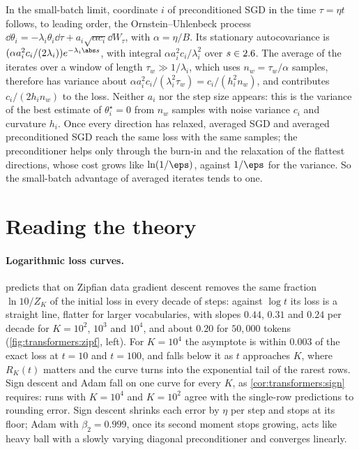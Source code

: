 \begin{refsection}
\begin{heuristic}
In the small-batch limit, coordinate $i$ of preconditioned SGD in the time $\tau=\eta t$ follows, to leading order, the Ornstein--Uhlenbeck process $\dd\theta_i=-\lambda_i\theta_i\dd\tau+a_i\sqrt{\alpha c_i}\dd W_\tau$, with $\alpha=\eta/B$. Its stationary autocovariance is $(\alpha a_i^2c_i/(2\lambda_i))e^{-\lambda_i\abs s}$, with integral $\alpha a_i^2c_i/\lambda_i^2$ over $s\in2.6$. The average of the iterates over a window of length $\tau_w\gg1/\lambda_i$, which uses $n_w=\tau_w/\alpha$ samples, therefore has variance about $\alpha a_i^2c_i/(\lambda_i^2\tau_w)=c_i/(h_i^2n_w)$, and contributes $c_i/(2h_in_w)$ to the loss. Neither $a_i$ nor the step size appears: this is the variance of the best estimate of $\theta_i^\star=0$ from $n_w$ samples with noise variance $c_i$ and curvature $h_i$. Once every direction has relaxed, averaged SGD and averaged preconditioned SGD reach the same loss with the same samples; the preconditioner helps only through the burn-in and the relaxation of the flattest directions, whose cost grows like $\ln(1/\eps)$, against $1/\eps$ for the variance. So the small-batch advantage of averaged iterates tends to one.
\end{heuristic}

\section{Reading the theory}\label{sec:transformers:reading}

\paragraph{Logarithmic loss curves.}  predicts that on Zipfian data gradient descent removes the same fraction $\ln10/Z_K$ of the initial loss in every decade of steps: against $\log t$ its loss is a straight line, flatter for larger vocabularies, with slopes $0.44$, $0.31$ and $0.24$ per decade for $K=10^2$, $10^3$ and $10^4$, and about $0.20$ for $50{,}000$ tokens (\cref{fig:transformers:zipf}, left). For $K=10^4$ the asymptote is within $0.003$ of the exact loss at $t=10$ and $t=100$, and falls below it as $t$ approaches $K$, where $R_K(t)$ matters and the curve turns into the exponential tail of the rarest rows. Sign descent and Adam fall on one curve for every $K$, as \cref{cor:transformers:sign} requires: runs with $K=10^4$ and $K=10^2$ agree with the single-row predictions to rounding error. Sign descent shrinks each error by $\eta$ per step and stops at its floor; Adam with $\beta_2=0.999$, once its second moment stops growing, acts like heavy ball with a slowly varying diagonal preconditioner and converges linearly.


\end{refsection}
